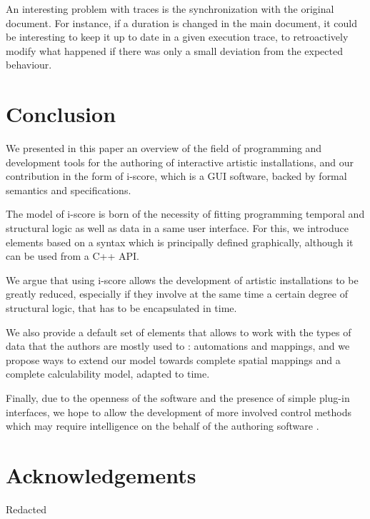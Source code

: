 \documentclass{sigchi}
\begin{document}
An interesting problem with traces is the synchronization with the original document. For instance, if a duration is changed in the main document, it could be interesting to keep it up to date in a given execution trace, to retroactively modify what happened if there was only a small deviation from the expected behaviour.

\section{Conclusion}
We presented in this paper an overview of the field of programming and development tools for the authoring of interactive artistic installations, and our contribution in the form of i-score, which is a GUI software, backed by formal semantics and specifications. 

The model of i-score is born of the necessity of fitting programming temporal and structural logic as well as data in a same user interface. For this, we introduce elements based on a syntax which is principally defined graphically, although it can be used from a C++ API.

We argue that using i-score allows the development of artistic installations to be greatly reduced, especially if they involve at the same time a certain degree of structural logic, that has to be encapsulated in time.

We also provide a default set of elements that allows to work with the types of data that the authors are mostly used to : automations and mappings, and we propose ways to extend our model towards complete spatial mappings and a complete calculability model, adapted to time.

Finally, due to the openness of the software and the presence of simple plug-in interfaces, we hope to allow the development of more involved control methods which may require intelligence on the behalf of the authoring software
.
\section{Acknowledgements}
Redacted



\end{document}
